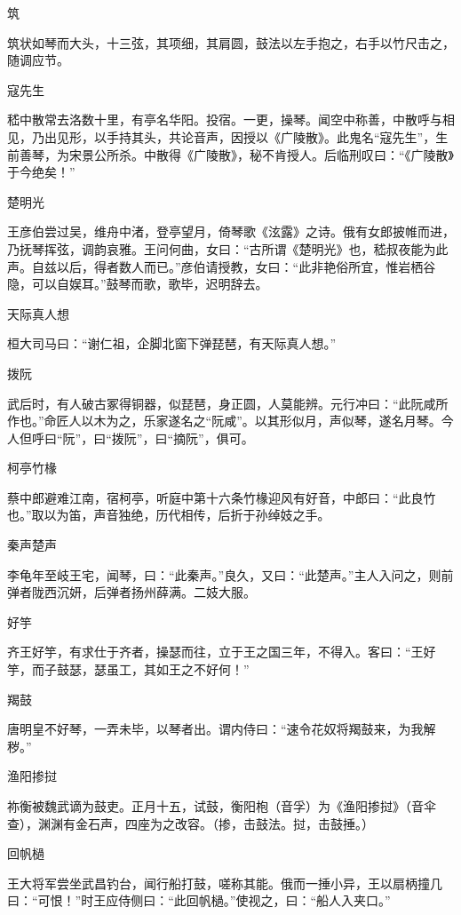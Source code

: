 \documentclass[a4paper,12pt,UTF8,twoside]{ctexbook}
\begin{document}
    筑
    
    筑状如琴而大头，十三弦，其项细，其肩圆，鼓法以左手抱之，右手以竹尺击之，随调应节。
    
    寇先生
    
    嵇中散常去洛数十里，有亭名华阳。投宿。一更，操琴。闻空中称善，中散呼与相见，乃出见形，以手持其头，共论音声，因授以《广陵散》。此鬼名“寇先生”，生前善琴，为宋景公所杀。中散得《广陵散》，秘不肯授人。后临刑叹曰：“《广陵散》于今绝矣！”
    
    楚明光
    
    王彦伯尝过吴，维舟中渚，登亭望月，倚琴歌《泫露》之诗。俄有女郎披帷而进，乃抚琴挥弦，调韵哀雅。王问何曲，女曰：“古所谓《楚明光》也，嵇叔夜能为此声。自兹以后，得者数人而已。”彦伯请授教，女曰：“此非艳俗所宜，惟岩栖谷隐，可以自娱耳。”鼓琴而歌，歌毕，迟明辞去。
    
    天际真人想
    
    桓大司马曰：“谢仁祖，企脚北窗下弹琵琶，有天际真人想。”
    
    拨阮
    
    武后时，有人破古冢得铜器，似琵琶，身正圆，人莫能辨。元行冲曰：“此阮咸所作也。”命匠人以木为之，乐家遂名之“阮咸”。以其形似月，声似琴，遂名月琴。今人但呼曰“阮”，曰“拨阮”，曰“摘阮”，俱可。
    
    柯亭竹椽
    
    蔡中郎避难江南，宿柯亭，听庭中第十六条竹椽迎风有好音，中郎曰：“此良竹也。”取以为笛，声音独绝，历代相传，后折于孙绰妓之手。
    
    秦声楚声
    
    李龟年至岐王宅，闻琴，曰：“此秦声。”良久，又曰：“此楚声。”主人入问之，则前弹者陇西沉妍，后弹者扬州薛满。二妓大服。
    
    好竽
    
    齐王好竽，有求仕于齐者，操瑟而往，立于王之国三年，不得入。客曰：“王好竽，而子鼓瑟，瑟虽工，其如王之不好何！”
    
    羯鼓
    
    唐明皇不好琴，一弄未毕，以琴者出。谓内侍曰：“速令花奴将羯鼓来，为我解秽。”
    
    渔阳掺挝
    
    祢衡被魏武谪为鼓吏。正月十五，试鼓，衡阳枹（音孚）为《渔阳掺挝》（音伞查），渊渊有金石声，四座为之改容。（掺，击鼓法。挝，击鼓捶。）
    
    回帆檛
    
    王大将军尝坐武昌钓台，闻行船打鼓，嗟称其能。俄而一捶小异，王以扇柄撞几曰：“可恨！”时王应侍侧曰：“此回帆檛。”使视之，曰：“船人入夹口。”
    
\end{document}
